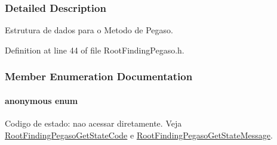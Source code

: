 \subsubsection{Detailed Description}
Estrutura de dados para o Metodo de Pegaso. 

Definition at line 44 of file RootFindingPegaso.h.

\subsubsection{Member Enumeration Documentation}
\hypertarget{structRootFindingPegaso_42aeda2085b8adb7e28eea9973f2e522}{
\paragraph["@8]{\setlength{\rightskip}{0pt plus 5cm}anonymous enum}\hfill}
\label{structRootFindingPegaso_42aeda2085b8adb7e28eea9973f2e522}


Codigo de estado: nao acessar diretamente. Veja \hyperlink{group____pegaso_g83892750b865aa977fcdba83922ad6fb}{RootFindingPegasoGetStateCode} e \hyperlink{group____pegaso_g2328683ae067772b11e3127fe800448d}{RootFindingPegasoGetStateMessage}. 

